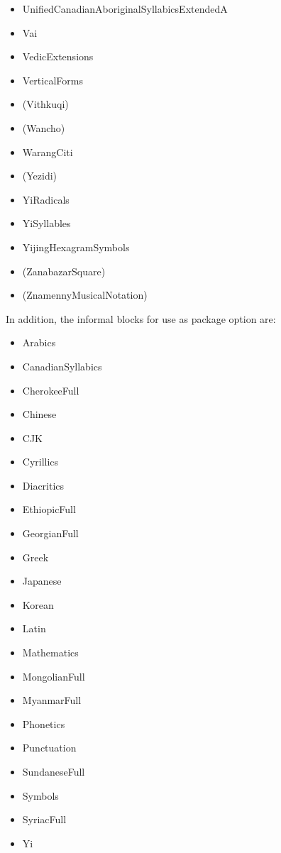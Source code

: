 \documentclass{article}
\newenvironment{itemlist}{%
  \begin{itemize}
  \setlength{\itemsep}{0pt}
  \setlength{\parsep}{0pt}
  \setlength{\topsep}{0pt}
  \setlength{\partopsep}{0pt}
  \setlength{\parskip}{0pt}
  \setlength{\labelsep}{5pt}}%
{
  \end{itemize}}
\begin{document}
\begin{multicols*}{2}
\begin{itemlist}
        \item UnifiedCanadianAboriginalSyllabicsExtendedA
        \item Vai
        \item VedicExtensions
        \item VerticalForms
        \item (Vithkuqi)
        \item (Wancho)
        \item WarangCiti
        \item (Yezidi)
        \item YiRadicals
        \item YiSyllables
        \item YijingHexagramSymbols
        \item (ZanabazarSquare)
        \item (ZnamennyMusicalNotation)
      \end{itemlist}
    \end{multicols*}

    In addition, the informal blocks for use as package option are:

    \begin{multicols*}{2}
      \begin{itemlist}
        \item Arabics
        \item CanadianSyllabics
        \item CherokeeFull
        \item Chinese
        \item CJK
        \item Cyrillics
        \item Diacritics
        \item EthiopicFull
        \item GeorgianFull
        \item Greek
        \item Japanese
        \item Korean
        \item Latin
        \item Mathematics
        \item MongolianFull
        \item MyanmarFull
        \item Phonetics
        \item Punctuation
        \item SundaneseFull
        \item Symbols
        \item SyriacFull
        \item Yi
      \end{itemlist}
    \end{multicols*}
\end{document}
